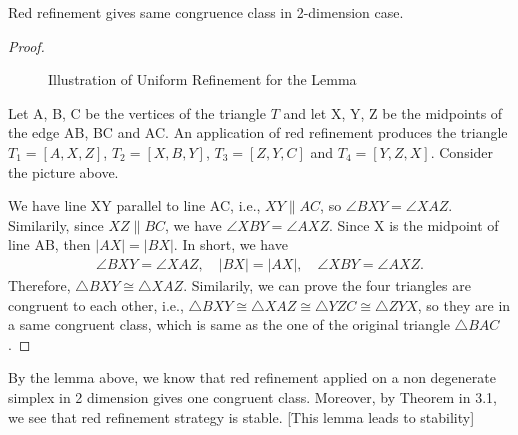     \begin{lemma*}
    Red refinement gives same congruence class in 2-dimension case.
    \end{lemma*}
    \begin{proof}\mbox{}\\
    \begin{figure}
    \centering
    \caption{Illustration of Uniform Refinement for the Lemma}
    \label{Fig4}
    \end{figure}

    Let A, B, C be the vertices of the triangle $T$ and let X, Y, Z be the midpoints of the edge AB, BC and AC. An application of red refinement produces the triangle $T_1 = [A, X, Z]$, $T_2 = [X, B, Y]$, $T_3 = [Z, Y, C]$ and $T_4 = [Y, Z, X]$. Consider the picture above.

    We have line XY parallel to line AC, i.e., $XY \parallel AC$, so $\angle{BXY} = \angle{XAZ}$. Similarily, since $XZ\parallel BC$, we have $\angle{XBY} = \angle{AXZ}$. Since X is the midpoint of line AB, then $|AX| = |BX|$. In short, we have 
    \begin{align*}
    \angle{BXY} = \angle{XAZ},
    \quad
    |BX| = |AX|,
    \quad
    \angle{XBY} = \angle{AXZ}.
    \end{align*}
    Therefore, $\triangle{BXY} \cong \triangle{XAZ}$. Similarily, we can prove the four triangles are congruent to each other, i.e., $\triangle{BXY}\cong\triangle{XAZ}\cong\triangle{YZC} \cong\triangle{ZYX}$, so they are in a same congruent class, which is same as the one of the original triangle $\triangle{BAC}$.
    \end{proof}
    By the lemma above, we know that red refinement applied on a non degenerate simplex in 2 dimension gives one congruent class. Moreover, by Theorem in 3.1, we see that red refinement strategy is stable.
    [This lemma leads to stability]

